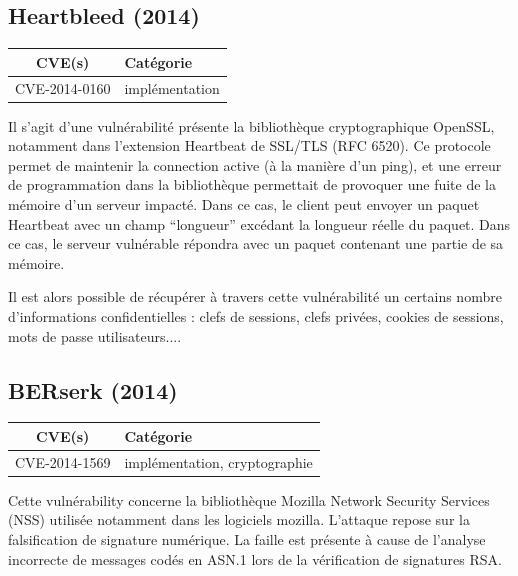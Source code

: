 \subsection{Heartbleed (2014)}

\begin{tabularx}{0.96\textwidth}{|c|X|}
  \hline
  \textbf{CVE(s)} & \textbf{Catégorie} \\
  \hline
  CVE-2014-0160 & implémentation \\
  \hline
\end{tabularx}

\vspace{1em}

Il s'agit d'une vulnérabilité présente la bibliothèque cryptographique OpenSSL, notamment dans l'extension Heartbeat de SSL/TLS (RFC 6520). Ce protocole permet de maintenir la connection active (à la manière d'un ping), et une erreur de programmation dans la bibliothèque permettait de provoquer une fuite de la mémoire d'un serveur impacté. Dans ce cas, le client peut envoyer un paquet Heartbeat avec un champ ``longueur'' excédant la longueur réelle du paquet. Dans ce cas, le serveur vulnérable répondra avec un paquet contenant une partie de sa mémoire.

Il est alors possible de récupérer à travers cette vulnérabilité un certains nombre d'informations confidentielles : clefs de sessions, clefs privées, cookies de sessions, mots de passe utilisateurs...\cite{heartbleed}.




\subsection{BERserk (2014)}

\begin{tabularx}{0.96\textwidth}{|c|X|}
  \hline
  \textbf{CVE(s)} & \textbf{Catégorie} \\
  \hline
  CVE-2014-1569 & implémentation, cryptographie \\
  \hline
\end{tabularx}

\vspace{1em}

Cette vulnérability concerne la bibliothèque Mozilla Network Security Services (NSS) utilisée notamment dans les logiciels mozilla. L'attaque repose sur la falsification de signature numérique. La faille est présente à cause de l'analyse incorrecte de messages codés en ASN.1 lors de la vérification de signatures RSA.

